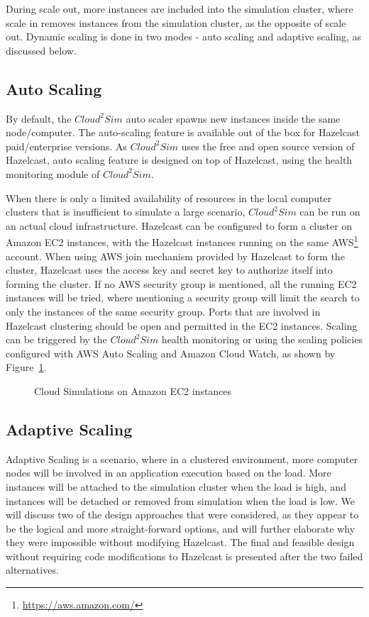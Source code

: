 During scale out, more instances are included into the simulation cluster, where scale in removes instances from the simulation cluster, as the opposite of scale out. Dynamic scaling is done in two modes - auto scaling and adaptive scaling, as discussed below.

\subsection{Auto Scaling}
By default, the $Cloud^{2}Sim$ auto scaler spawns new instances inside the same node/computer. The auto-scaling feature is available out of the box for Hazelcast paid/enterprise versions. As $Cloud^{2}Sim$ uses the free and open source version of Hazelcast, auto scaling feature is designed on top of Hazelcast, using the health monitoring module of $Cloud^{2}Sim$. 

When there is only a limited availability of resources in the local computer clusters that is insufficient to simulate a large scenario, $Cloud^{2}Sim$ can be run on an actual cloud infrastructure. Hazelcast can be configured to form a cluster on Amazon EC2 instances, with the Hazelcast instances running on the same AWS\footnote{\url{https://aws.amazon.com/}} account. When using AWS join mechanism provided by Hazelcast to form the cluster, Hazelcast uses the access key and secret key to authorize itself into forming the cluster. If no AWS security group is mentioned, all the running EC2 instances will be tried, where mentioning a security group will limit the search to only the instances of the same security group. Ports that are involved in Hazelcast clustering should be open and permitted in the EC2 instances. Scaling can be triggered by the $Cloud^{2}Sim$ health monitoring or using the scaling policies configured with AWS Auto Scaling and Amazon Cloud Watch, as shown by Figure~\ref{fig:aws}.

\begin{figure}[!h]
\begin{center}
\end{center}
 \caption{Cloud Simulations on Amazon EC2 instances}
 \label{fig:aws}
\end{figure}

\subsection{Adaptive Scaling}
Adaptive Scaling is a scenario, where in a clustered environment, more computer nodes will be involved in an application execution based on the load. More instances will be attached to the simulation cluster when the load is high, and instances will be detached or removed from simulation when the load is low. We will discuss two of the design approaches that were considered, as they appear to be the logical and more straight-forward options, and will further elaborate why they were impossible without modifying Hazelcast. The final and feasible design without requiring code modifications to Hazelcast is presented after the two failed alternatives.

